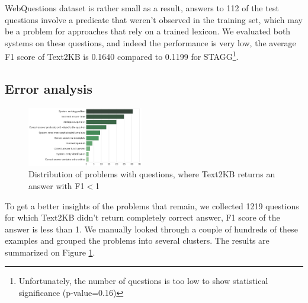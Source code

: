 WebQuestions dataset is rather small as a result, answers to 112 of the test questions involve a predicate that weren't observed in the training set, which may be a problem for approaches that rely on a trained lexicon.
We evaluated both systems on these questions, and indeed the performance is very low, \ie the average F1 score of Text2KB is 0.1640 compared to 0.1199 for STAGG\footnote{Unfortunately, the number of questions is too low to show statistical significance (p-value=0.16)}.

\subsection{Error analysis}
\label{section:analysis:error}

\begin{figure}
\centering
\includegraphics[width=0.45\textwidth]{img/error_analysis}
\vspace{-0.5cm}
\caption{Distribution of problems with questions, where Text2KB returns an answer with F1$<$1}
\label{fig:error_analysis}
\vspace{-0.3cm}
\end{figure}

To get a better insights of the problems that remain, we collected 1219 questions for which Text2KB didn't return completely correct answer, \ie F1 score of the answer is less than 1.
We manually looked through a couple of hundreds of these examples and grouped the problems into several clusters.
The results are summarized on Figure \ref{fig:error_analysis}.

